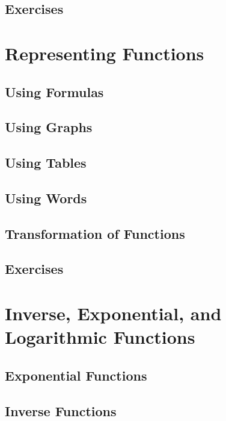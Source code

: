 \documentclass[]{book}
\begin{document}
\subsection{Exercises}\label{exercises}

\section{Representing Functions}\label{representing-functions}

\subsection{Using Formulas}\label{using-formulas}

\subsection{Using Graphs}\label{using-graphs}

\subsection{Using Tables}\label{using-tables}

\subsection{Using Words}\label{using-words}

\subsection{Transformation of
Functions}\label{transformation-of-functions}

\subsection{Exercises}\label{exercises-1}

\section{Inverse, Exponential, and Logarithmic
Functions}\label{inverse-exponential-and-logarithmic-functions}

\subsection{Exponential Functions}\label{exponential-functions}

\subsection{Inverse Functions}\label{inverse-functions}
\end{document}
